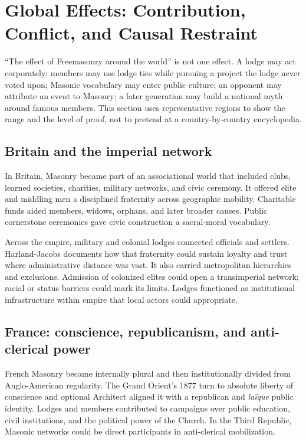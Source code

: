 \section{Global Effects: Contribution, Conflict, and Causal Restraint}

“The effect of Freemasonry around the world” is not one effect. A lodge may act corporately; members may use lodge ties while pursuing a project the lodge never voted upon; Masonic vocabulary may enter public culture; an opponent may attribute an event to Masonry; a later generation may build a national myth around famous members. This section uses representative regions to show the range and the level of proof, not to pretend at a country-by-country encyclopedia.

\subsection{Britain and the imperial network}

In Britain, Masonry became part of an associational world that included clubs, learned societies, charities, military networks, and civic ceremony. It offered elite and middling men a disciplined fraternity across geographic mobility. Charitable funds aided members, widows, orphans, and later broader causes. Public cornerstone ceremonies gave civic construction a sacral-moral vocabulary.

Across the empire, military and colonial lodges connected officials and settlers. Harland-Jacobs documents how that fraternity could sustain loyalty and trust where administrative distance was vast. It also carried metropolitan hierarchies and exclusions. Admission of colonized elites could open a transimperial network; racial or status barriers could mark its limits. Lodges functioned as institutional infrastructure within empire that local actors could appropriate.

\subsection{France: conscience, republicanism, and anti-clerical power}

French Masonry became internally plural and then institutionally divided from Anglo-American regularity. The Grand Orient's 1877 turn to absolute liberty of conscience and optional Architect aligned it with a republican and \emph{laïque} public identity. Lodges and members contributed to campaigns over public education, civil institutions, and the political power of the Church. In the Third Republic, Masonic networks could be direct participants in anti-clerical mobilization.

